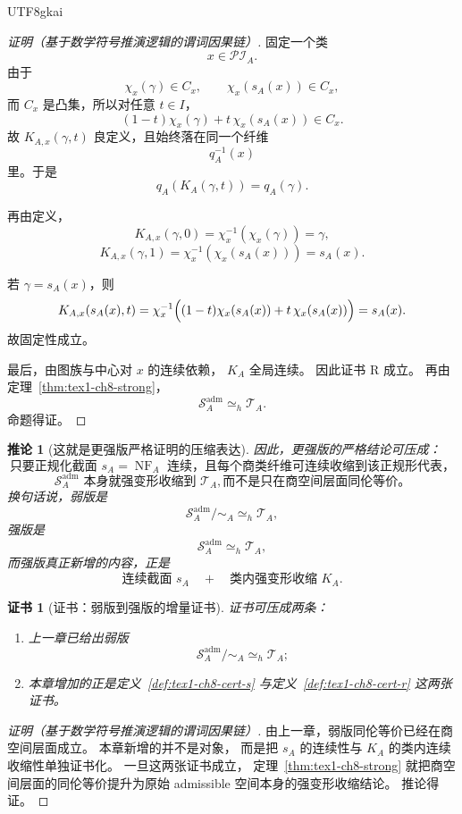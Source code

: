\documentclass[12pt]{article}
\newtheorem{corollary}{推论}[section]
\newtheorem{Certificate}{证书}[section]
\begin{document}
\begin{CJK*}{UTF8}{gkai}
\begin{proof}[证明（基于数学符号推演逻辑的谓词因果链）]
固定一个类
\[
  x\in \mathcal{PI}_A.
\]
由于
\[
  \chi_x(\gamma)\in C_x,
  \qquad
  \chi_x(s_A(x))\in C_x,
\]
而 \(C_x\) 是凸集，所以对任意 \(t\in I\)，
\[
  (1-t)\chi_x(\gamma)+t\,\chi_x(s_A(x))\in C_x.
\]
故 \(K_{A,x}(\gamma,t)\) 良定义，且始终落在同一个纤维
\[
  q_A^{-1}(x)
\]
里。于是
\[
  q_A(K_A(\gamma,t))=q_A(\gamma).
\]

再由定义，
\[
  K_{A,x}(\gamma,0)=\chi_x^{-1}(\chi_x(\gamma))=\gamma,
\]
\[
  K_{A,x}(\gamma,1)=\chi_x^{-1}(\chi_x(s_A(x)))=s_A(x).
\]

若 \(\gamma=s_A(x)\)，则
\[
  K_{A,x}(s_A(x),t)
  =
  \chi_x^{-1}
  \Bigl(
    (1-t)\chi_x(s_A(x))+t\,\chi_x(s_A(x))
  \Bigr)
  =
  s_A(x).
\]
故固定性成立。

最后，由图族与中心对 \(x\) 的连续依赖，
\(K_A\) 全局连续。
因此证书 R 成立。
再由定理~\ref{thm:tex1-ch8-strong}，
\[
  \mathcal S_A^{\mathrm{adm}}\simeq_h \mathcal T_A.
\]
命题得证。
\end{proof}

\begin{corollary}[这就是更强版严格证明的压缩表达]
\label{cor:tex1-ch8-strong}
因此，更强版的严格结论可压成：
\[
  \boxed{
    \text{只要正规化截面 }s_A=\operatorname{NF}_A\text{ 连续，且每个商类纤维可连续收缩到该正规形代表，}
  }
\]
\[
  \boxed{
    \mathcal S_A^{\mathrm{adm}}\text{ 本身就强变形收缩到 } \mathcal T_A,
    \text{而不是只在商空间层面同伦等价。}
  }
\]
换句话说，弱版是
\[
  \mathcal S_A^{\mathrm{adm}}/\sim_A \simeq_h \mathcal T_A,
\]
强版是
\[
  \mathcal S_A^{\mathrm{adm}} \simeq_h \mathcal T_A,
\]
而强版真正新增的内容，正是
\[
  \boxed{
    \text{连续截面 }s_A
    \quad+\quad
    \text{类内强变形收缩 }K_A.
  }
\]
\end{corollary}

\begin{Certificate}[证书：弱版到强版的增量证书]
\label{cert:tex1-ch8-upgrade}
证书可压成两条：
\begin{enumerate}
  \item 上一章已给出弱版
  \[
    \mathcal S_A^{\mathrm{adm}}/\sim_A \simeq_h \mathcal T_A;
  \]
  \item 本章增加的正是定义~\ref{def:tex1-ch8-cert-s} 与定义~\ref{def:tex1-ch8-cert-r} 这两张证书。
\end{enumerate}
\end{Certificate}

\begin{proof}[证明（基于数学符号推演逻辑的谓词因果链）]
由上一章，弱版同伦等价已经在商空间层面成立。
本章新增的并不是对象，
而是把 \(s_A\) 的连续性与 \(K_A\) 的类内连续收缩性单独证书化。
一旦这两张证书成立，
定理~\ref{thm:tex1-ch8-strong} 就把商空间层面的同伦等价提升为原始 admissible 空间本身的强变形收缩结论。
推论得证。
\end{proof}


\end{CJK*}
\end{document}
